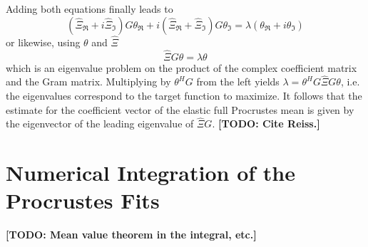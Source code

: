 Adding both equations finally leads to  
$$( \hat\Xi_\Re + i \hat\Xi_\Im) G \theta_\Re + i (\hat\Xi_\Re + \hat\Xi_\Im) G \theta_\Im = \lambda ( \theta_\Re + i \theta_\Im)$$
or likewise, using $\theta$ and $\hat\Xi$
$$ \hat\Xi G \theta = \lambda \theta $$
which is an eigenvalue problem on the product of the complex coefficient matrix and the Gram matrix.
Multiplying by $\theta^H G$ from the left yields $\lambda = \theta^H G \hat\Xi G \theta$, i.e. the eigenvalues correspond to the target function to maximize.
It follows that the estimate for the coefficient vector of the elastic full Procrustes mean is given by the eigenvector of the leading eigenvalue of $\hat\Xi G$.
\textbf{[TODO: Cite Reiss.]}



\section{Numerical Integration of the Procrustes Fits}
\label{sec:pfit}
\textbf{[TODO: Mean value theorem in the integral, etc.]}

